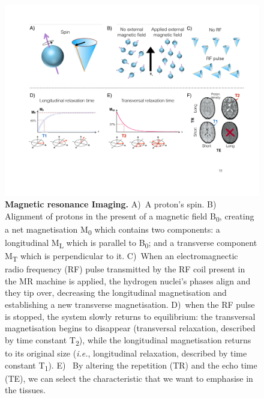 \begin{figure}[h!]
\centering\includegraphics[width=1\linewidth]{images/Ch2/Ch2_spins.pdf}
\caption{\textbf{Magnetic resonance Imaging.} A)~A proton's spin. B)~ Alignment of protons in the present of a magnetic field B\textsubscript{0}, creating a net magnetisation M\textsubscript{0} which contains two components: a longitudinal M\textsubscript{L} which is parallel to B\textsubscript{0}; and a transverse component M\textsubscript{T} which is perpendicular to it. C)~When an electromagnectic radio frequency (RF) pulse transmitted by the RF coil present in the MR machine is applied, the hydrogen nuclei's phases align and they tip over, decreasing the longitudinal magnetisation and establishing a new transverse magnetisation. D)~when the RF pulse is stopped, the system slowly returns to equilibrium: the transversal magnetisation begins to disappear (transversal relaxation, described by time constant T\textsubscript{2}), while the longitudinal magnetisation returns to its original size (\textit{i.e.}, longitudinal relaxation, described by time constant T\textsubscript{1}). E)
~By altering the repetition (TR) and the echo time (TE), we can select the characteristic that we want to emphasise in the tissues.} \label{fig:ch2_spins}
\end{figure}




